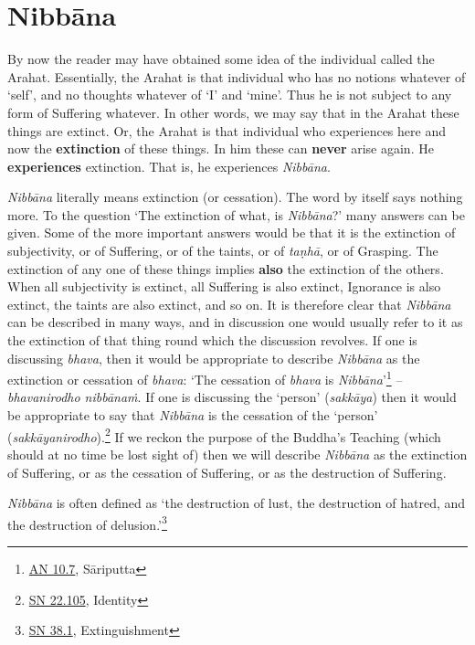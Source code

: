 \chapter{Nibbāna}

By now the reader may have obtained some idea of the individual called the Arahat. Essentially, the Arahat is that individual who has no notions whatever of `self', and no thoughts whatever of `I' and `mine'. Thus he is not subject to any form of Suffering whatever. In other words, we may say that in the Arahat these things are extinct. Or, the Arahat is that individual who experiences here and now the \textbf{extinction} of these things. In him these can \textbf{never} arise again. He \textbf{experiences} extinction. That is, he experiences \emph{Nibbāna}.

\emph{Nibbāna} literally means extinction (or cessation). The word by itself says nothing more. To the question `The extinction of what, is \emph{Nibbāna}?' many answers can be given. Some of the more important answers would be that it is the extinction of subjectivity, or of Suffering, or of the taints, or of \emph{taṇhā}, or of Grasping. The extinction of any one of these things implies \textbf{also} the extinction of the others. When all subjectivity is extinct, all Suffering is also extinct, Ignorance is also extinct, the taints are also extinct, and so on. It is therefore clear that \emph{Nibbāna} can be described in many ways, and in discussion one would usually refer to it as the extinction of that thing round which the discussion revolves. If one is discussing \emph{bhava}, then it would be appropriate to describe \emph{Nibbāna} as the extinction or cessation of \emph{bhava}: `The cessation of \emph{bhava} is \emph{Nibbāna}'\footnote{\href{https://suttacentral.net/an10.7/en/bodhi}{AN 10.7}, Sāriputta} -- \emph{bhavanirodho nibbānaṁ}. If one is discussing the `person' (\emph{sakkāya}) then it would be appropriate to say that \emph{Nibbāna} is the cessation of the `person' (\emph{sakkāyanirodho}).\footnote{\href{https://suttacentral.net/sn22.105/en/sujato}{SN 22.105}, Identity} If we reckon the purpose of the Buddha's Teaching (which should at no time be lost sight of) then we will describe \emph{Nibbāna} as the extinction of Suffering, or as the cessation of Suffering, or as the destruction of Suffering.

\emph{Nibbāna} is often defined as `the destruction of lust, the destruction of hatred, and the destruction of delusion.'\footnote{\href{https://suttacentral.net/sn38.1/en/sujato}{SN 38.1}, Extinguishment}

